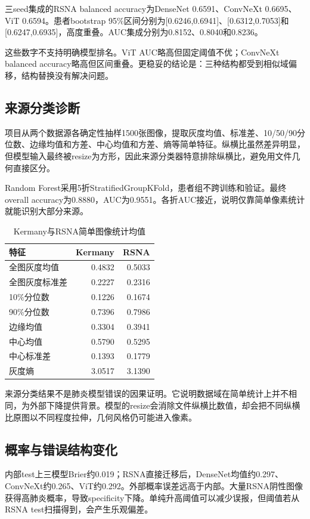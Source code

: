 三seed集成的RSNA balanced accuracy为DenseNet 0.6591、ConvNeXt 0.6695、ViT 0.6594。患者bootstrap 95\%区间分别为[0.6246,0.6941]、[0.6312,0.7053]和[0.6247,0.6935]，高度重叠。AUC集成分别为0.8152、0.8040和0.8236。

这些数字不支持明确模型排名。ViT AUC略高但固定阈值不优；ConvNeXt balanced accuracy略高但区间重叠。更稳妥的结论是：三种结构都受到相似域偏移，结构替换没有解决问题。

\subsection{来源分类诊断}

项目从两个数据源各确定性抽样1500张图像，提取灰度均值、标准差、10/50/90分位数、边缘均值和方差、中心均值和方差、熵等简单特征。纵横比虽然差异明显，但模型输入最终被resize为方形，因此来源分类器特意排除纵横比，避免用文件几何直接区分。

Random Forest采用5折StratifiedGroupKFold，患者组不跨训练和验证。最终overall accuracy为0.8880，AUC为0.9551。各折AUC接近，说明仅靠简单像素统计就能识别大部分来源。

\begin{table}[H]
\centering
\caption{Kermany与RSNA简单图像统计均值}
\begin{tabular}{lrr}
\toprule 特征 & Kermany & RSNA\\\midrule
全图灰度均值 & 0.4832 & 0.5033\\
全图灰度标准差 & 0.2227 & 0.2316\\
10\%分位数 & 0.1226 & 0.1674\\
90\%分位数 & 0.7396 & 0.7986\\
边缘均值 & 0.3304 & 0.3941\\
中心均值 & 0.5790 & 0.5295\\
中心标准差 & 0.1393 & 0.1779\\
灰度熵 & 3.0517 & 3.1390\\\bottomrule
\end{tabular}
\end{table}

来源分类结果不是肺炎模型错误的因果证明。它说明数据域在简单统计上并不相同，为外部下降提供背景。模型的resize会消除文件纵横比数值，却会把不同纵横比原图以不同程度拉伸，几何风格仍可能进入像素。

\subsection{概率与错误结构变化}

内部test上三模型Brier约0.019；RSNA直接迁移后，DenseNet均值约0.297、ConvNeXt约0.265、ViT约0.292。外部概率误差远高于内部。大量RSNA阴性图像获得高肺炎概率，导致specificity下降。单纯升高阈值可以减少误报，但阈值若从RSNA test扫描得到，会产生乐观偏差。

